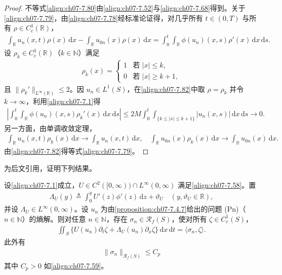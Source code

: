 \documentclass[../../main.tex]{subfiles}%
\begin{document}
\begin{proof}
不等式\eqref{align:ch07-7.80}由\eqref{align:ch07-7.52}与\eqref{align:ch07-7.68}得到。关于\eqref{align:ch07-7.79}，由\eqref{align:ch07-7.78}经标准论证得，对几乎所有 $t\in(0,T)$ 与所有 $\rho\in C^1_c(\mathbb{R})$，
\begin{align}
\int_{\mathbb{R}}u_n(x,t)\rho(x)\,\mathrm{d}x-\int_{\mathbb{R}}u_{0n}(x)\rho(x)\,\mathrm{d}x
=\int_0^t\int_{\mathbb{R}}\phi(u_n)(x,s)\rho'(x)\,\mathrm{d}x\,\mathrm{d}s. \label{align:ch07-7.82}
\end{align}
设 $\rho_k\in C^1_c(\mathbb{R})$（$k\in\mathbb{N}$）满足
\begin{align*}
\rho_k(x)=\begin{cases}1&\text{若 }|x|\leqslant k,\\0&\text{若 }|x|\geqslant k+1,\end{cases}
\end{align*}
且 $\|\rho_k'\|_{L^\infty(\mathbb{R})}\leqslant2$。因 $u_n\in L^1(S)$，在\eqref{align:ch07-7.82}中取 $\rho=\rho_k$ 并令 $k\to\infty$，利用\eqref{align:ch07-7.1}得
\begin{align*}
\left|\int_0^t\int_{\mathbb{R}}\phi(u_n)(x,s)\rho_k'(x)\,\mathrm{d}x\,\mathrm{d}s\right|
\leqslant2M\int_0^t\int_{\{k\leqslant|x|\leqslant k+1\}}|u_n(x,s)|\,\mathrm{d}x\,\mathrm{d}s\to0.
\end{align*}
另一方面，由单调收敛定理，
\begin{align*}
\int_{\mathbb{R}}u_n(x,t)\rho_k(x)\,\mathrm{d}x\to\int_{\mathbb{R}}u_n(x,t)\,\mathrm{d}x,\quad
\int_{\mathbb{R}}u_{0n}(x)\rho_k(x)\,\mathrm{d}x\to\int_{\mathbb{R}}u_{0n}(x)\,\mathrm{d}x.
\end{align*}
由\eqref{align:ch07-7.82}得等式\eqref{align:ch07-7.79}。
\end{proof}

为后文引用，证明下列结果。

\begin{lemma}\label{lemma:ch07-7.4.8}
设\eqref{align:ch07-7.1}成立，$U\in C^2([0,\infty))\cap L^\infty(0,\infty)$ 满足\eqref{align:ch07-7.58}。置
\begin{align}
\Lambda_U(y)\triangleq \int_0^y U'(z)\phi'(z)\,\mathrm{d}z+\vartheta_U\quad(y,\vartheta_U\in\mathbb{R}), \label{align:ch07-7.83}
\end{align}
并设 $\Lambda_U\in L^\infty(0,\infty)$。设 $u_n$ 为由\cref{proposition:ch07-7.4.7}给出的问题 (Pn)（$n\in\mathbb{N}$）的熵解。则对任意 $n\in\mathbb{N}$，存在 $\sigma_n\in\mathscr{R}_f(S)$，使对所有 $\zeta\in C^1_c(S)$，
\begin{align}
\iint_S\{U(u_n)\partial_t\zeta+\Lambda_U(u_n)\partial_x\zeta\}\,\mathrm{d}x\,\mathrm{d}t=\langle\sigma_n,\zeta\rangle. \label{align:ch07-7.84}
\end{align}
此外有
\begin{align}
\|\sigma_n\|_{\mathscr{R}_f(S)}\leqslant C_p \label{align:ch07-7.85}
\end{align}
其中 $C_p>0$ 如\eqref{align:ch07-7.59}。
\end{lemma}
\end{document}
